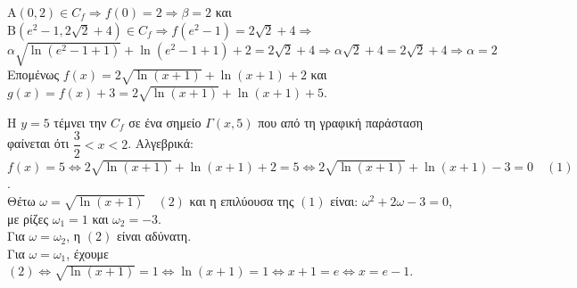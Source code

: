 \begin{alist}
\item $\text{A}(0, 2) \in C_f \Rightarrow f(0) = 2 \Rightarrow \beta = 2$ και \\
$\text{B}(e^2 - 1, 2\sqrt{2} + 4) \in C_f \Rightarrow f(e^2 - 1) = 2\sqrt{2} + 4 \Rightarrow$ \\
$\alpha\sqrt{\ln(e^2 - 1 + 1)} + \ln(e^2 - 1 + 1) + 2 = 2\sqrt{2} + 4 \Rightarrow \alpha\sqrt{2} + 4 = 2\sqrt{2} + 4 \Rightarrow \alpha = 2$ \\
Επομένως $f(x) = 2\sqrt{\ln(x + 1)} + \ln(x + 1) + 2$ και \\
$g(x) = f(x) + 3 = 2\sqrt{\ln(x + 1)} + \ln(x + 1) + 5$.
\item Η $y = 5$ τέμνει την $C_f$ σε ένα σημείο $\Gamma(x, 5)$ που από τη γραφική παράσταση φαίνεται ότι $\dfrac{3}{2} < x < 2$. Αλγεβρικά: \\
$f(x) = 5 \Leftrightarrow 2\sqrt{\ln(x + 1)} + \ln(x + 1) + 2 = 5 \Leftrightarrow 2\sqrt{\ln(x + 1)} + \ln(x + 1) - 3 = 0 \quad (1)$. \\
Θέτω $\omega = \sqrt{\ln(x + 1)} \quad (2)$ και η επιλύουσα της $(1)$ είναι: $\omega^2 + 2\omega - 3 = 0$, με ρίζες $\omega_1 = 1$ και $\omega_2 = -3$. \\
Για $\omega = \omega_2$, η $(2)$ είναι αδύνατη. \\
Για $\omega = \omega_1$, έχουμε \\
$(2) \Leftrightarrow \sqrt{\ln(x + 1)} = 1 \Leftrightarrow \ln(x + 1) = 1 \Leftrightarrow x + 1 = e \Leftrightarrow x = e - 1$.
\end{alist}

